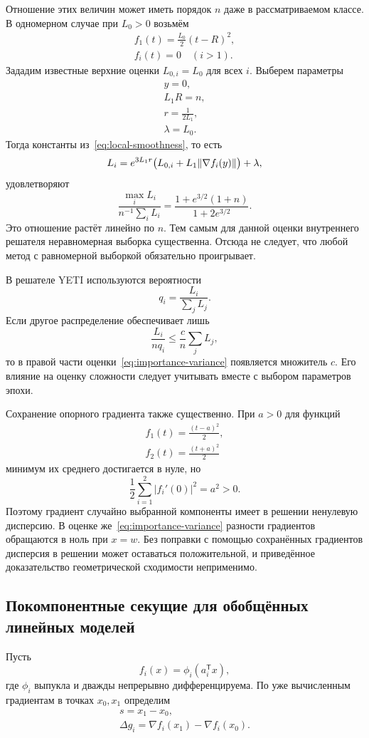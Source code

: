 Отношение этих величин может иметь порядок $n$ даже в рассматриваемом классе.
В одномерном случае при $L_0>0$ возьмём
\[
 \begin{gathered}
 f_1(t)=\frac{L_0}{2}(t-R)^2,\\
 f_i(t)=0\quad(i>1).
 \end{gathered}
\]
Зададим известные верхние оценки $L_{0,i}=L_0$ для всех $i$.
Выберем параметры
\[
 \begin{gathered}
 y=0,\\
 L_1R=n,\\
 r=\frac1{2L_1},\\
 \lambda=L_0.
 \end{gathered}
\]
Тогда константы из~\eqref{eq:local-smoothness}, то есть
\[
 L_i=e^{3L_1r}\bigl(L_{0,i}+L_1\lVert\nabla f_i(y)\rVert\bigr)+\lambda,
\]
удовлетворяют
\[
 \frac{\max_iL_i}{n^{-1}\sum_iL_i}
 =\frac{1+e^{3/2}(1+n)}{1+2e^{3/2}}.
\]
Это отношение растёт линейно по $n$. Тем самым для данной оценки
внутреннего решателя неравномерная выборка существенна. Отсюда не следует,
что любой метод с равномерной выборкой обязательно проигрывает.

В решателе YETI используются вероятности
\[
 q_i=\frac{L_i}{\sum_jL_j}.
\]
Если другое распределение обеспечивает лишь
\[
 \frac{L_i}{nq_i}\le\frac cn\sum_jL_j,
\]
то в правой части оценки~\eqref{eq:importance-variance}
появляется множитель $c$. Его влияние на оценку сложности
следует учитывать вместе с выбором параметров эпохи.

Сохранение опорного градиента также существенно. При $a>0$ для функций
\[
 \begin{gathered}
 f_1(t)=\frac{(t-a)^2}{2},\\
 f_2(t)=\frac{(t+a)^2}{2}
 \end{gathered}
\]
минимум их среднего достигается в нуле, но
\[
 \frac12\sum_{i=1}^2|f_i'(0)|^2=a^2>0.
\]
Поэтому градиент случайно выбранной компоненты имеет в решении ненулевую
дисперсию. В оценке же~\eqref{eq:importance-variance}
разности градиентов обращаются в ноль при $x=w$.
Без поправки с помощью сохранённых градиентов дисперсия в решении
может оставаться положительной, и приведённое доказательство
геометрической сходимости неприменимо.

\subsection{Покомпонентные секущие для обобщённых линейных моделей}

Пусть
\[
 f_i(x)=\phi_i(a_i^{\mathsf T}x),
\]
где $\phi_i$ выпукла и дважды непрерывно дифференцируема.
По уже вычисленным градиентам в точках $x_0,x_1$ определим
\[
 \begin{gathered}
 s=x_1-x_0,\\
 \Delta g_i=\nabla f_i(x_1)-\nabla f_i(x_0).
 \end{gathered}
\]

